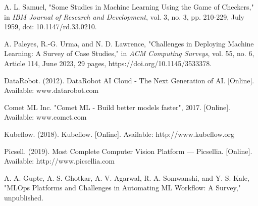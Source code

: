 \documentclass[12pt,a4paper]{report}     %
\begin{document}
\newpage
{}

\begin{normalsize}
				{\setlength{\baselineskip}{1.1\baselineskip}
{
\begin{thebibliography}{9}

 A. L. Samuel, "Some Studies in Machine Learning Using the Game of Checkers," in \emph{IBM Journal of Research and Development}, vol. 3, no. 3, pp. 210-229, July 1959, doi: 10.1147/rd.33.0210.

 A. Paleyes, R.-G. Urma, and N. D. Lawrence, "Challenges in Deploying Machine Learning: A Survey of Case Studies," in \emph{ACM Computing Surveys}, vol. 55, no. 6, Article 114, June 2023, 29 pages, https://doi.org/10.1145/3533378.

 DataRobot. (2012). DataRobot AI Cloud - The Next Generation of AI. [Online]. Available: www.datarobot.com

 Comet ML Inc. "Comet ML - Build better models faster", 2017. [Online]. Available: www.comet.com

 Kubeflow. (2018). Kubeflow. [Online]. Available: http://www.kubeflow.org

 Picsell. (2019). Most Complete Computer Vision Platform — Picsellia. [Online]. Available: http://www.picsellia.com

 A. A. Gupte, A. S. Ghotkar, A. V. Agarwal, R. A. Somwanshi, and Y. S. Kale, "MLOps Platforms and Challenges in Automating ML Workflow: A Survey," unpublished.


\end{thebibliography}
\par}
}

\newpage					%

\appendix
{}
\newpage					%

\appendix
{}

 

\newpage					%
\appendix
{}
 
\newpage					%
\appendix
{}
 
\newpage					%
\appendix
{}
 
\end{normalsize}
\end{document}
